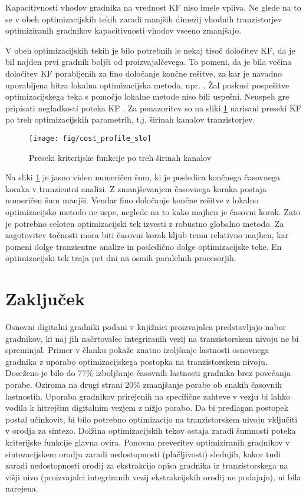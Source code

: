 \documentclass[journal,a4paper,twoside]{template/IEEEtran}
\begin{document}
Kapacitivnosti vhodov gradnika na vrednost KF niso imele vpliva. Ne glede na to se v obeh optimizacijskih tekih zaradi manjših dimezij vhodnih tranzistorjev optimiziranih gradnikov kapacitivnosti vhodov vseeno zmanjšajo.

V obeh optimizacijskih tekih je bilo potrebnih le nekaj tisoč določitev KF, da je bil najden prvi gradnik boljši od proizvajalčevega. To pomeni, da je bila večina določitev KF porabljenih za fino določanje končne rešitve, za kar je navadno uporabljena hitra lokalna optimizacijska metoda, npr. \cite{hooke}. Žal poskusi pospešitve optimizacijskega teka s pomočjo lokalne metode niso bili uspešni. Neuspeh gre pripisati negladkosti poteka KF \cite{burmen2}. Za ponazoritev so na sliki \ref{cost_profile} narisani preseki KF po treh optimizacijskih parametrih, t.j. širinah kanalov tranzistorjev.

\begin{figure}[htb]
\centerline{\texttt{[image: fig/cost\_profile\_slo]}}
\caption{Preseki kriterijske funkcije po treh širinah kanalov}
\label{cost_profile}
\end{figure}

Na sliki \ref{cost_profile} je jasno viden numeričen šum, ki je posledica končnega časovnega koraka v tranzientni analizi. Z zmanjševanjem časovnega koraka postaja numeričen šum manjši. Vendar fino določanje končne rešitve z lokalno optimizacijsko metodo ne uspe, neglede na to kako majhen je  časovni korak. Zato je potrebno celoten optimizacijski tek izvesti z robustno globalno metodo. Za zagotovitev točnosti mora biti časovni korak kljub temu relativno majhen, kar pomeni dolge tranzientne analize in posledično dolge optimizacijske teke. En optimizacijski tek traja pet dni na osmih paralelnih procesorjih.

\section{Zaključek}
Osnovni digitalni gradniki podani v knjižnici proizvajalca predstavljajo nabor gradnikov, ki naj jih načrtovalec integriranih vezij na tranzistorskem nivoju ne bi spreminjal. Primer v članku pokaže znatno izoljšanje lastnosti osnovnega gradnika z uporabo optimizacijskega postopka na tranzistorskem nivoju. Doseženo je bilo do 77\% izboljšanje časovnih lastnosti gradnika brez povečanja porabe. Oziroma na drugi strani 20\% zmanjšanje porabe ob enakih časovnih lastnostih. Uporaba gradnikov prirejenih na specifične zahteve v vezju bi lahko vodila k hitrejšim digitalnim vezjem z nižjo porabo. Da bi predlagan postopek postal učinkovit, bi bilo potrebno optimizacijo na tranzistorskem nivoju vključiti v orodja za sintezo. Dolžina optimizacijskih tekov ostaja zaradi šumnosti poteka kriterijske funkcije glavna ovira. Ponovna preveritev optimiziranih gradnikov v sintezacijskem orodju zaradi nedostopnosti (plačljivosti) slednjih, kakor tudi zaradi nedostopnosti orodij za ekstrakcijo opisa gradnika iz tranzistorskega na višji nivo (proizvajalci integriranih vezij ekstrakcijskih orodij ne podajajo), ni bila narejena.
\end{document}
